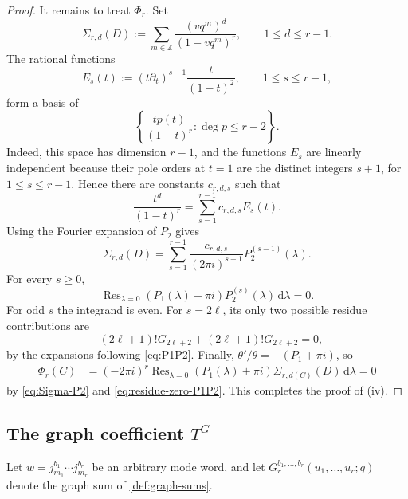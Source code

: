 \documentclass[11pt,a4paper]{amsart}
\numberwithin{equation}{section}
\theoremstyle{definition}
\theoremstyle{remark}
\DeclareMathOperator*{\Res}{Res}
\newcommand{\ZZ}{\mathbb Z}
\newcommand{\ii}{i}
\newcommand{\dd}{\mathrm d}
\begin{document}
\begin{proof}
It remains to treat $\Phi_r$.  Set
\begin{equation*}
 \Sigma_{r,d}(D):=\sum_{m\in\ZZ}
 \frac{(vq^m)^d}{(1-vq^m)^r},
 \qquad 1\leq d\leq r-1.
\end{equation*}
The rational functions
\begin{equation*}
 E_s(t):=(t\partial_t)^{s-1}\frac{t}{(1-t)^2},
 \qquad 1\leq s\leq r-1,
\end{equation*}
form a basis of
\begin{equation*}
 \left\{\frac{t p(t)}{(1-t)^r}:\deg p\leq r-2\right\}.
\end{equation*}
Indeed, this space has dimension $r-1$, and the functions $E_s$ are
linearly independent because their pole orders at $t=1$ are the distinct
integers $s+1$, for $1\leq s\leq r-1$.  Hence there are constants
$c_{r,d,s}$ such that
\begin{equation*}
 \frac{t^d}{(1-t)^r}=\sum_{s=1}^{r-1}c_{r,d,s}E_s(t).
\end{equation*}
Using the Fourier expansion of $P_2$ gives
\begin{equation}
 \Sigma_{r,d}(D)=\sum_{s=1}^{r-1}
 \frac{c_{r,d,s}}{(2\pi\ii)^{s+1}}P_2^{(s-1)}(\lambda).
 \label{eq:Sigma-P2}
\end{equation}
For every $s\geq0$,
\begin{equation}
 \Res_{\lambda=0}
 (P_1(\lambda)+\pi\ii)P_2^{(s)}(\lambda)\,\dd\lambda=0.
 \label{eq:residue-zero-P1P2}
\end{equation}
For odd $s$ the integrand is even.  For $s=2\ell$, its only two possible
residue contributions are
\begin{equation*}
 -(2\ell+1)!G_{2\ell+2}
 +(2\ell+1)!G_{2\ell+2}=0,
\end{equation*}
by the expansions following \eqref{eq:P1P2}.  Finally,
$\theta'/\theta=-(P_1+\pi\ii)$, so
\begin{align*}
 [u_{i_1}^0\cdots u_{i_r}^0]\Phi_r(C)
 &=(-2\pi\ii)^r\Res_{\lambda=0}
 (P_1(\lambda)+\pi\ii)
 \Sigma_{r,d(C)}(D)\,\dd\lambda=0
\end{align*}
by \eqref{eq:Sigma-P2} and \eqref{eq:residue-zero-P1P2}.  This completes the proof of (iv).
\end{proof}

\subsection{The graph coefficient \texorpdfstring{$T^G$}{TG}}

 Let $w=j_{m_1}^{b_1}\cdots j_{m_r}^{b_r}$ be an arbitrary mode word, and let $G_r^{b_1,\ldots,b_r}(u_1,\ldots, u_r;q)$ denote the graph
sum of \cref{def:graph-sums}. 
\end{document}
